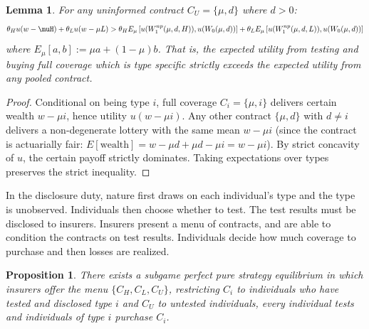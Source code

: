 \documentclass[natbib=false,preprint,12pt]{elsarticle}
\theoremstyle{plain}
\newtheorem{lemma}[theorem]{Lemma}
\newtheorem{prop}[theorem]{Proposition}
\theoremstyle{definition}
\theoremstyle{plain}
\theoremstyle{TheoremNum}
\theoremstyle{CorollaryNum}
\theoremstyle{PropositionNum}
\theoremstyle{TheoremNum}
\begin{document}
\setcounter{theorem}{0}
\renewcommand{\thetheorem}{\arabic{theorem}}
\begin{lemma}\label{lemma:alwaysbuy}
    For any uninformed contract $C_U = \{\mu,d\}$ where $d>0$:
    \begin{align*}
        \theta_H u (w-\muH)+\theta_L u(w-\mu L)>\theta_H E_\mu \left[u(W_{1}^{np}(\mu,d,H)),u(W_0(\mu,d))\right]+\theta_L E_\mu\left[u(W_1^{np}(\mu,d,L)),u(W_0(\mu,d))\right]
    \end{align*}
    where $E_\mu[a,b]:= \mu a + (1-\mu)b$. That is, the expected utility from testing and buying full coverage which is type specific strictly exceeds the expected utility from any pooled contract.
\end{lemma}

\begin{proof}
    Conditional on being type $i$, full coverage $C_i = \{\mu,i\}$ delivers certain wealth $w-\mu i$, hence utility $u(w-\mu i)$. Any other contract $\{\mu,d\}$ with $d \neq i$ delivers a non-degenerate lottery with the same mean $w-\mu i$ (since the contract is actuarially fair: $E[\text{wealth}]=w-\mu d +\mu d -\mu i = w -\mu i$). By strict concavity of $u$, the certain payoff strictly dominates. Taking expectations over types preserves the strict inequality.
\end{proof}

In the disclosure duty, nature first draws on each individual's type and the type is unobserved. Individuals then choose whether to test. The test results must be disclosed to insurers. Insurers present a menu of contracts, and are able to condition the contracts on test results. Individuals decide how much coverage to purchase and then losses are realized.

\setcounter{theorem}{1}
\renewcommand{\thetheorem}{\arabic{theorem}}
\begin{prop}\label{prop:ddeqnoprinciple}
     There exists a subgame perfect pure strategy equilibrium in which insurers offer the menu $\{C_H, C_L, C_U\}$, restricting $C_i$ to individuals who have tested and disclosed type $i$ and $C_U$ to untested individuals, every individual tests and individuals of type $i$ purchase $C_i$.
\end{prop}
\end{document}
